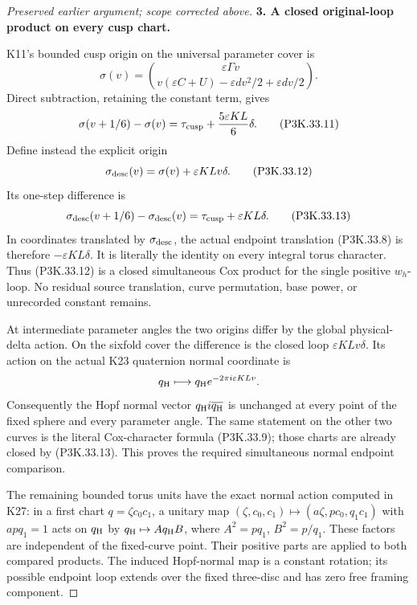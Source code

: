 \begin{proof}[Preserved earlier argument; scope corrected above]
\par\medskip\noindent\textbf{3. A closed original-loop product on every cusp chart.}\enspace

K11's bounded cusp origin on the universal parameter cover is
\[
 \sigma(v)=
 \binom{\varepsilon\Gamma v}
       {v(\varepsilon C+U)-\varepsilon dv^2/2+\varepsilon dv/2}.
\]
Direct subtraction, retaining the constant term, gives
\[
 \sigma(v+1/6)-\sigma(v)
      =\tau_{\rm cusp}+\frac{5\varepsilon KL}{6}\delta. \tag{P3K.33.11}
\]
Define instead the explicit origin
\[
             \sigma_{\rm desc}(v)=\sigma(v)+\varepsilon KLv\delta.
                                                               \tag{P3K.33.12}
\]
Its one-step difference is
\[
 \sigma_{\rm desc}(v+1/6)-\sigma_{\rm desc}(v)
                    =\tau_{\rm cusp}+\varepsilon KL\delta. \tag{P3K.33.13}
\]
In coordinates translated by \(\sigma_{\rm desc}\), the actual
endpoint translation (P3K.33.8) is therefore \(-\varepsilon KL\delta\).
It is literally the identity on every integral torus character.
Thus (P3K.33.12) is a closed simultaneous Cox product for the single
positive \(w_h\)-loop. No residual source translation, curve
permutation, base power, or unrecorded constant remains.

At intermediate parameter angles the two origins differ by the
global physical-delta action. On the sixfold cover the difference
is the closed loop \(\varepsilon KLv\delta\). Its action on the actual K23
quaternion normal coordinate is
\[
             q_{\rm H}\longmapsto
                       q_{\rm H}e^{-2\pi i\varepsilon KLv}.
\]
Consequently the Hopf normal vector
\(q_{\rm H}i\overline{q_{\rm H}}\) is unchanged at every
point of the fixed sphere and every parameter angle. The same
statement on the other two curves is the literal Cox-character
formula (P3K.33.9); those charts are already closed by (P3K.33.13).
This proves the required simultaneous normal endpoint comparison.

The remaining bounded torus units have the exact normal action
computed in K27: in a first chart \(q=\zeta c_0c_1\), a unitary
map \((\zeta,c_0,c_1)\mapsto(a\zeta,pc_0,q_1c_1)\) with
\(apq_1=1\) acts on \(q_{\rm H}\) by
\(q_{\rm H}\mapsto A q_{\rm H}B\), where
\(A^2=pq_1\), \(B^2=p/q_1\). These factors are independent
of the fixed-curve point. Their positive parts are applied to
both compared products. The induced Hopf-normal map is a
constant rotation; its possible endpoint loop extends over the
fixed three-disc and has zero free framing component.


\end{proof}
